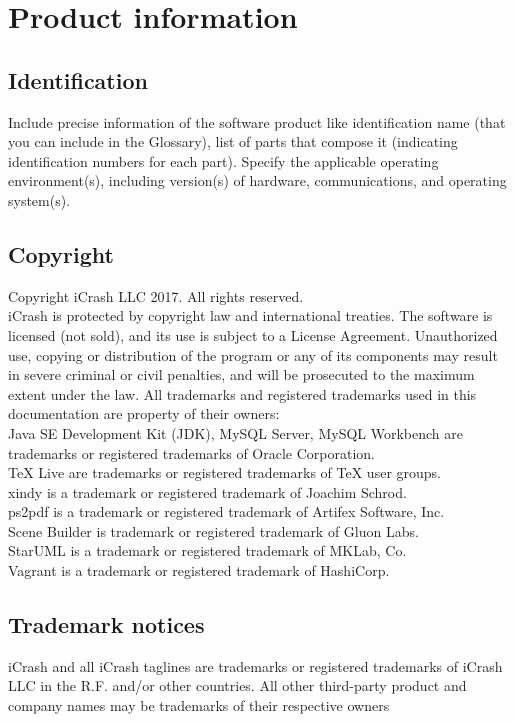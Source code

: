 \chapter{Product information}
\vspace{-6em}


\section{Identification}
Include precise information of the software product like identification name (that you can include in the \gls{Glossary}), list of parts that compose it (indicating identification numbers for each part). 
Specify the applicable operating environment(s), including version(s) of hardware, communications, and operating system(s).

\section{Copyright}

Copyright iCrash LLC 2017. All rights reserved.\\
iCrash is protected by copyright law and international treaties. The software is
licensed (not sold), and its use is subject to a License Agreement. Unauthorized
use, copying or distribution of the program or any of its components may result in severe criminal or civil penalties, and will be prosecuted to the maximum extent under the law.
All trademarks and registered trademarks used in this documentation are property
of their owners:\\
Java SE Development Kit (JDK), MySQL Server, MySQL Workbench are trademarks or
registered trademarks of Oracle Corporation.\\
TeX Live are trademarks or registered trademarks of TeX user groups.\\
xindy is a trademark or registered trademark of Joachim Schrod. \\
ps2pdf  is a trademark or registered trademark of Artifex Software, Inc.\\
Scene Builder is trademark or registered trademark of Gluon Labs.\\
StarUML is a trademark or registered trademark of MKLab, Co.\\
Vagrant is a trademark or registered trademark of HashiCorp.\\


\section{Trademark notices}
iCrash and all iCrash taglines are trademarks or registered trademarks of iCrash LLC in the R.F. and/or other countries. All other third-party product and company names may be trademarks of their respective owners


